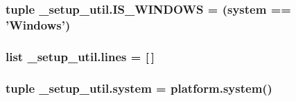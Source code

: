 \hypertarget{namespace__setup__util_a6fe69c2dbd92959b6651a28cbb846e6e}{
\subsubsection[{I\-S\-\_\-\-W\-I\-N\-D\-O\-W\-S}]{\setlength{\rightskip}{0pt plus 5cm}tuple \-\_\-setup\-\_\-util.\-I\-S\-\_\-\-W\-I\-N\-D\-O\-W\-S = ({\bf system} == 'Windows')}}\label{namespace__setup__util_a6fe69c2dbd92959b6651a28cbb846e6e}
\hypertarget{namespace__setup__util_a8618d8be5f729d4c9696daa5e083a001}{
\subsubsection[{lines}]{\setlength{\rightskip}{0pt plus 5cm}list \-\_\-setup\-\_\-util.\-lines = \mbox{[}$\,$\mbox{]}}}\label{namespace__setup__util_a8618d8be5f729d4c9696daa5e083a001}
\hypertarget{namespace__setup__util_a5883fa688e2e824754a412ffc772863e}{
\subsubsection[{system}]{\setlength{\rightskip}{0pt plus 5cm}tuple \-\_\-setup\-\_\-util.\-system = platform.\-system()}}\label{namespace__setup__util_a5883fa688e2e824754a412ffc772863e}
